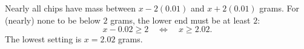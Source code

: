 Nearly all chips have mass between $x-2(0.01)$ and $x+2(0.01)$ grams. For (nearly) none to be below $2$ grams, the lower end must be at least $2$:
\[
x-0.02\ge2\quad\Longleftrightarrow\quad x\ge2.02 .
\]
The lowest setting is $x=\boxed{2.02}$ grams.
